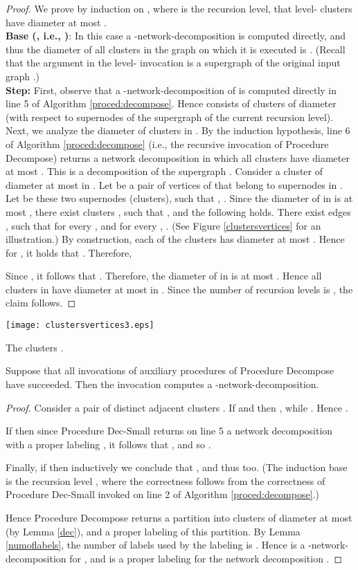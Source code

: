 \documentclass[11pt]{article}
\begin{document}
\begin{proof}
We prove by induction on  , where  is the recursion level, that level- clusters have diameter at most . \\
{\bf Base (, i.e., )}: In this case a -network-decomposition is computed directly, and thus the diameter of all clusters in the graph  on which it is executed is . (Recall that the argument  in the  level- invocation is a supergraph of the original input graph .)\\
{\bf Step:} First, observe that a -network-decomposition of  is computed directly in line 5 of Algorithm \ref{proced:decompose}. Hence  consists of clusters of diameter  (with respect to supernodes of the supergraph  of the current recursion level). Next, we analyze the diameter of clusters in . By the induction hypothesis, line 6 of Algorithm \ref{proced:decompose} (i.e., the recursive invocation of Procedure Decompose) returns a network decomposition in which all clusters have diameter at most . This is a decomposition of the supergraph . Consider a cluster  of diameter at most  in . 
Let  be a pair of vertices of  that belong to supernodes in . Let  be these two supernodes (clusters), such that , . Since the diameter of  in  is at most , there exist clusters , such that , and the following holds. There exist edges , such that 
for every , and for every , . 
(See Figure \ref{clustersvertices} for an illustration.)
By construction, each of the clusters  has diameter at most . Hence for , it holds that . Therefore, 

Since , it follows that .
Therefore, the diameter of  in  is at most . Hence all clusters in  have diameter at most  in . Since the number of recursion levels is , the claim follows.
\end{proof}
\texttt{[image: clustersvertices3.eps]}
\begin{fig} \label{clustersvertices}
The clusters .
\end{fig}
\begin{lem} \label{lemmac}
Suppose that all invocations of auxiliary procedures of Procedure Decompose have succeeded. Then the invocation computes a -network-decomposition.
\end{lem}
\begin{proof}
Consider a pair of distinct adjacent clusters . If  and  then , while . Hence .

If  then since Procedure Dec-Small returns on line 5 a network decomposition with a proper labeling , it follows that , and so .

Finally, if  then inductively we conclude that , and thus  too. (The induction base is the recursion level , where the correctness follows from the correctness of Procedure Dec-Small invoked on line 2 of Algorithm \ref{proced:decompose}.)

Hence Procedure Decompose returns a partition  into clusters of diameter at most  (by Lemma \ref{dec}), and a proper labeling  of this partition. By Lemma \ref{numoflabels}, the number of labels used by the labeling  is . Hence  is a -network-decomposition for , and  is a proper labeling for the network decomposition .
\end{proof}
\end{document}
